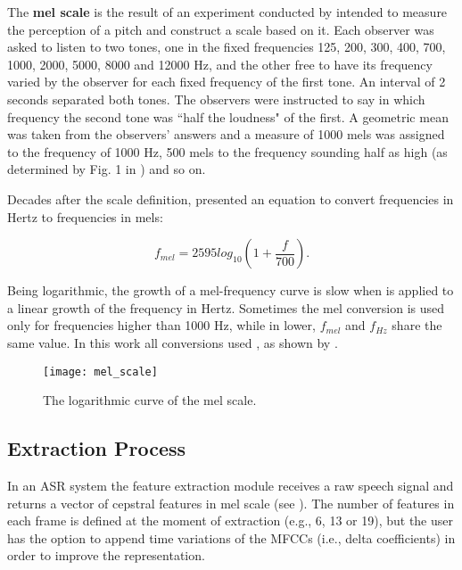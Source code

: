 The \textbf{mel scale} is the result of an experiment conducted by  intended to measure the perception of a pitch and construct a scale based on it. Each observer was asked to listen to two tones, one in the fixed frequencies 125, 200, 300, 400, 700, 1000, 2000, 5000, 8000 and 12000 Hz, and the other free to have its frequency varied by the observer for each fixed frequency of the first tone. An interval of 2 seconds separated both tones. The observers were instructed to say in which frequency the second tone was ``half the loudness" of the first. A geometric mean was taken from the observers' answers and a measure of 1000 mels was assigned to the frequency of 1000 Hz, 500 mels to the frequency sounding half as high (as determined by Fig. 1 in ) and so on.

Decades after the scale definition,  presented an equation to convert frequencies in Hertz to frequencies in mels:

\begin{equation}
    f_{mel} = 2595 log_{10}(1 + \frac{f}{700}).
    \label{eq:mel_conversion}
\end{equation}

\noindent Being logarithmic, the growth of a mel-frequency curve is slow when  is applied to a linear growth of the frequency in Hertz. Sometimes the mel conversion is used only for frequencies higher than 1000 Hz, while in lower, $f_{mel}$ and $f_{Hz}$ share the same value. In this work all conversions used , as shown by .

\begin{figure}[ht]
    \centering
    \texttt{[image: mel\_scale]}
    \caption{The logarithmic curve of the mel scale.}
    \label{fig:mel_scale}
\end{figure}

\subsection{Extraction Process}

In an ASR system the feature extraction module receives a raw speech signal and returns a vector of cepstral features in mel scale (see ). The number of features in each frame is defined at the moment of extraction (e.g., 6, 13 or 19), but the user has the option to append time variations of the MFCCs (i.e., delta coefficients) in order to improve the representation.

